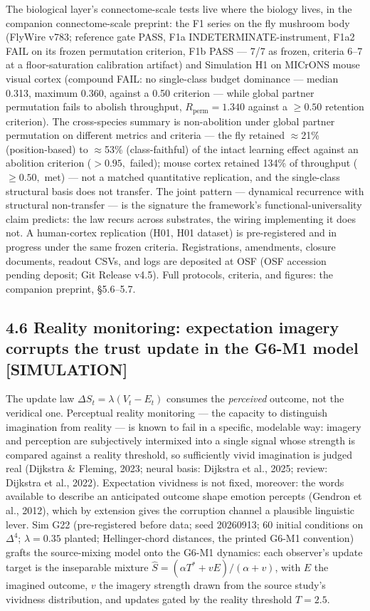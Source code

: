 \documentclass[11pt,twocolumn]{article}
\theoremstyle{gttdef}
\theoremstyle{gttplain}
\begin{document}
The biological layer's connectome-scale tests live where the biology lives, in the companion connectome-scale preprint: the F1 series on the fly mushroom body (FlyWire v783; reference gate PASS, F1a INDETERMINATE-instrument, F1a2 FAIL on its frozen permutation criterion, F1b PASS --- 7/7 as frozen, criteria 6--7 at a floor-saturation calibration artifact) and Simulation H1 on MICrONS mouse visual cortex (compound FAIL: no single-class budget dominance --- median 0.313, maximum 0.360, against a 0.50 criterion --- while global partner permutation fails to abolish throughput, $R_{\mathrm{perm}} = 1.340$ against a $\geq 0.50$ retention criterion). The cross-species summary is non-abolition under global partner permutation on different metrics and criteria --- the fly retained $\approx$21\% (position-based) to $\approx$53\% (class-faithful) of the intact learning effect against an abolition criterion ($>0.95,$ failed); mouse cortex retained 134\% of throughput ($\geq 0.50,$ met) --- not a matched quantitative replication, and the single-class structural basis does not transfer. The joint pattern --- dynamical recurrence with structural non-transfer --- is the signature the framework's functional-universality claim predicts: the law recurs across substrates, the wiring implementing it does not. A human-cortex replication (H01, H01 dataset) is pre-registered and in progress under the same frozen criteria. Registrations, amendments, closure documents, readout CSVs, and logs are deposited at OSF (OSF accession pending deposit; Git Release v4.5). Full protocols, criteria, and figures: the companion preprint, \S{}5.6--5.7.

\subsection*{4.6 Reality monitoring: expectation imagery corrupts the trust update in the G6-M1 model [SIMULATION]}

The update law $\Delta S_t = \lambda(V_t - E_t)$ consumes the \emph{perceived} outcome, not the veridical one. Perceptual reality monitoring --- the capacity to distinguish imagination from reality --- is known to fail in a specific, modelable way: imagery and perception are subjectively intermixed into a single signal whose strength is compared against a reality threshold, so sufficiently vivid imagination is judged real (Dijkstra \& Fleming, 2023; neural basis: Dijkstra et al., 2025; review: Dijkstra et al., 2022). Expectation vividness is not fixed, moreover: the words available to describe an anticipated outcome shape emotion percepts (Gendron et al., 2012), which by extension gives the corruption channel a plausible linguistic lever. Sim G22 (pre-registered before data; seed 20260913; 60 initial conditions on $\Delta^{4}$; $\lambda = 0.35$ planted; Hellinger-chord distances, the printed G6-M1 convention) grafts the source-mixing model onto the G6-M1 dynamics: each observer's update target is the inseparable mixture $\hat{S} = (\alpha T^{*} + v E)/(\alpha + v)$, with $E$ the imagined outcome, $v$ the imagery strength drawn from the source study's vividness distribution, and updates gated by the reality threshold $T = 2.5$.
\end{document}
